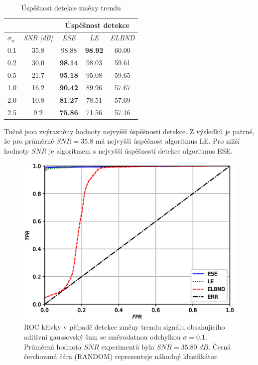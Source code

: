 \begin{table}[h!]
\caption{Úspěšnost detekce změny trendu}
\centering
\begin{tabular}{|l|c|c|c|c|}
\hline
\multicolumn{2}{|l|}{} & \multicolumn{3}{c|}{\textbf{Úspěšnost detekce}} \\ \hline
$\sigma_n$ & \textit{SNR [dB]} & \textit{ESE} & \textit{LE} & \textit{ELBND} \\ \hline
0.1 & 35.8 & 98.88 & \textbf{98.92} & 60.00 \\ \hline
0.2 & 30.0 & \textbf{98.14} & 98.03 & 59.61 \\ \hline
0.5 & 21.7 & \textbf{95.18} & 95.08 & 59.65 \\ \hline
1.0 & 16.2 & \textbf{90.42} & 89.96 & 57.67 \\ \hline
2.0 & 10.8 & \textbf{81.27} & 78.51 & 57.69 \\ \hline
2.5 & 9.2 & \textbf{75.86} & 71.56 & 57.16 \\ \hline
\end{tabular}
\label{tab:dr}
\end{table}
Tučně jsou zvýrazněny hodnoty nejvyšší úspěšnosti detekce. Z výsledků je patrné, že pro průměrné $SNR=35.8$ má nejvyšší úspěšnost algoritmus LE. Pro nižší hodnoty $SNR$ je algoritmem s nejvyšší úspěšností detekce algoritmus ESE.
\begin{figure}[ht!]
    \centering
    \includegraphics[scale=0.7]{IMG/appel_roc/roc_01.eps}
    \caption{ROC křivky v případě detekce změny trendu signálu obsahujícího aditivní gaussovský šum se směrodatnou odchylkou $\sigma=0.1$. Průměrná hodnota $SNR$ experimentů byla $SNR=35.80$ $dB$. Černá čerchovaná čára (RANDOM) reprezentuje náhodný klasifikátor.}
    \label{fig:roc_01}
\end{figure}
